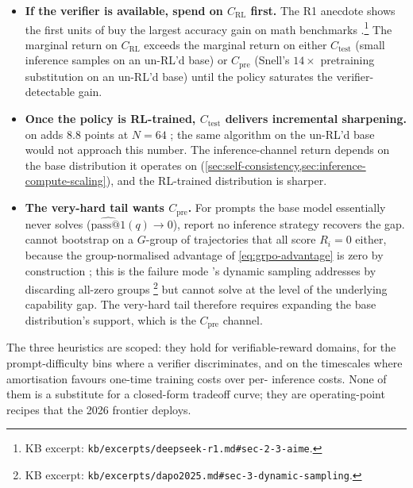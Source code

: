 \begin{itemize}
\item \textbf{If the verifier is available, spend on $C_\text{RL}$
first.} The R1 anecdote shows the first units of  buy the largest
accuracy gain on math benchmarks
\citep[\S 2.3]{deepseek-r1}.\footnote{KB excerpt:
\nolinkurl{kb/excerpts/deepseek-r1.md#sec-2-3-aime}.} The marginal
return on $C_\text{RL}$ exceeds the marginal return on either
$C_\text{test}$ (small inference samples on an un-RL'd base) or
$C_\text{pre}$ (Snell's $14\times$ pretraining substitution on an
un-RL'd base) until the policy saturates the verifier-detectable
gain.
\item \textbf{Once the policy is RL-trained, $C_\text{test}$ delivers
incremental sharpening.}  on  adds $8.8$
points at $N = 64$ \citep[\S 2.3]{deepseek-r1}; the same algorithm
on the un-RL'd base would not approach this number. The
inference-channel return depends on the base distribution it operates
on (\cref{sec:self-consistency,sec:inference-compute-scaling}),
and the RL-trained distribution is sharper.
\item \textbf{The very-hard tail wants $C_\text{pre}$.} For prompts
the base model essentially never solves
($\widehat{\mathrm{pass@}1}(q) \to 0$),
\citet[\S 6]{snell2024} report no inference strategy recovers the
gap.  cannot bootstrap on a $G$-group of trajectories that all
score $R_i = 0$ either, because the group-normalised advantage of
\cref{eq:grpo-advantage} is zero by construction
\citep[\S 4.1]{shao2024}; this is the failure mode 's dynamic
sampling addresses by discarding all-zero groups
\citep[\S 3]{dapo2025}\footnote{KB excerpt:
\nolinkurl{kb/excerpts/dapo2025.md#sec-3-dynamic-sampling}.} but cannot
solve at the level of the underlying capability gap. The very-hard
tail therefore requires expanding the base distribution's support,
which is the $C_\text{pre}$ channel.
\end{itemize}

The three heuristics are scoped: they hold for verifiable-reward
domains, for the prompt-difficulty bins where a verifier discriminates,
and on the timescales where amortisation favours one-time training
costs over per- inference costs. None of them is a substitute for
a closed-form tradeoff curve; they are operating-point recipes that
the 2026 frontier deploys.

